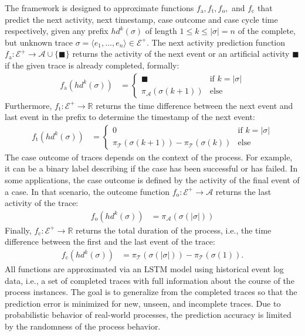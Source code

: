 The framework is designed to approximate functions $f_\mathrm{a}, f_\mathrm{t}, f_\mathrm{o},$ and $f_\mathrm{c}$ that predict the next activity, next timestamp, case outcome and case cycle time respectively, given any prefix $hd^k(\sigma)$ of length $1 \leq k \leq |\sigma| = n$ of the complete, but unknown trace $\sigma = \langle e_1, \dots, e_{n} \rangle \in \mathcal{E}^+$.
The next activity prediction function $f_\mathrm{a}\colon \mathcal{E}^+ \to \mathcal{A} \cup \{\blacksquare\}$ returns the activity of the next event or an artificial activity $\blacksquare$ if the given trace is already completed, formally:
\begin{align*}
f_\mathrm{a}(hd^k(\sigma)) &= 
\begin{cases}
	\blacksquare& \text{if $k = |\sigma|$} \\
	\pi_\mathcal{A}(\sigma(k+1)) & \text{else} 
\end{cases}
\end{align*}
Furthermore, $f_\mathrm{t} \colon \mathcal{E}^+ \to \mathbb{R}$ returns the time difference between the next event and last event in the prefix to determine the timestamp of the next event:
\begin{align*}
f_\mathrm{t}(hd^k(\sigma)) &=
\begin{cases}
0 & \text{if $k = |\sigma|$} \\
\pi_\mathcal{T}(\sigma(k+1)) - \pi_\mathcal{T}(\sigma(k)) & \text{else} 
\end{cases}
\end{align*}
The case outcome of traces depends on the context of the process.
For example, it can be a binary label describing if the case has been successful or has failed.
In some applications, the case outcome is defined by the activity of the final event of a case.
In that scenario, the outcome function $f_\mathrm{o} \colon \mathcal{E}^+ \to \mathcal{A}$ returns the last activity of the trace:
\begin{align*}
f_\mathrm{o}(hd^k(\sigma)) &= \pi_\mathcal{A}(\sigma(|\sigma|))
\end{align*}
Finally, $f_\mathrm{c} \colon \mathcal{E}^+ \to \mathbb{R}$ returns the total duration of the process, i.e., the time difference between the first and the last event of the trace:
\begin{align*}
f_\mathrm{c}(hd^k(\sigma)) &=  \pi_\mathcal{T}(\sigma(|\sigma|))-  \pi_\mathcal{T}(\sigma(1)).
\end{align*}
All functions are approximated via an LSTM model using historical event log data, i.e., a set of completed traces with full information about the course of the process instances.
The goal is to generalize from the completed traces so that the prediction error is minimized for new, unseen, and incomplete traces.
Due to probabilistic behavior of real-world processes, the prediction accuracy is limited by the randomness of the process behavior.

